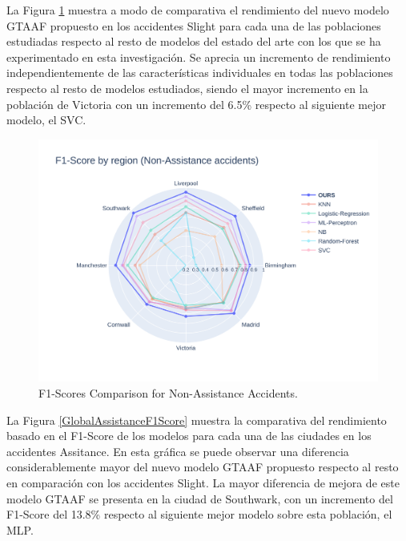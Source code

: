 \documentclass{uathesis-es}
\begin{document}
La Figura \ref{GlobalSlightF1Score} muestra a modo de comparativa el rendimiento del nuevo modelo GTAAF propuesto en los accidentes Slight para cada una de las poblaciones estudiadas respecto al resto de modelos del estado del arte con los que se ha experimentado en esta investigación. Se aprecia un incremento de rendimiento independientemente de las características individuales en todas las poblaciones respecto al resto de modelos estudiados, siendo el mayor incremento en la población de Victoria con un incremento del 6.5\% respecto al siguiente mejor modelo, el SVC.

\begin{figure}[H]
    \centering
    \includegraphics[width=150mm]{Figures/Slight.png}
    \caption{F1-Scores Comparison for Non-Assistance Accidents.}
    \label{GlobalSlightF1Score}
\end{figure}

La Figura \ref{GlobalAssistanceF1Score} muestra la comparativa del rendimiento basado en el F1-Score de los modelos para cada una de las ciudades en los accidentes Assitance. En esta gráfica se puede observar una diferencia considerablemente mayor del nuevo modelo GTAAF propuesto respecto al resto en comparación con los accidentes Slight. La mayor diferencia de mejora de este modelo GTAAF se presenta en la ciudad de Southwark, con un incremento del F1-Score del 13.8\% respecto al siguiente mejor modelo sobre esta población, el MLP.
\end{document}
